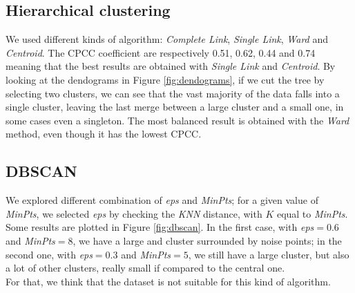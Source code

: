 \subsection{Hierarchical clustering}
We used different kinds of algorithm: \emph{Complete Link}, \emph{Single Link}, \emph{Ward} and \emph{Centroid}. The CPCC coefficient are respectively 0.51, 0.62, 0.44 and 0.74 meaning that the best results are obtained with \emph{Single Link} and \emph{Centroid}. By looking at the dendograms in Figure \ref{fig:dendograms}, if we cut the tree by selecting two clusters, we can see that the vast majority of the data falls into a single cluster, leaving the last merge between a large cluster and a small one, in some cases even a singleton. The most balanced result is obtained with the \emph{Ward} method, even though it has the lowest CPCC.

\subsection{DBSCAN}

We explored different combination of \emph{eps} and \emph{MinPts}; for a given value of \emph{MinPts}, we selected \emph{eps} by checking the \emph{KNN} distance, with $K$ equal to \emph{MinPts}.\\
Some results are plotted in Figure \ref{fig:dbscan}. In the first case, with \emph{eps}$= 0.6$ and \emph{MinPts}$=8$, we have a large and cluster surrounded by noise points; in the second one, with \emph{eps}$=0.3$ and \emph{MinPts}$=5$, we still have a large cluster, but also a lot of other clusters, really small if compared to the central one.\\
For that, we think that the dataset is not suitable for this kind of algorithm.

